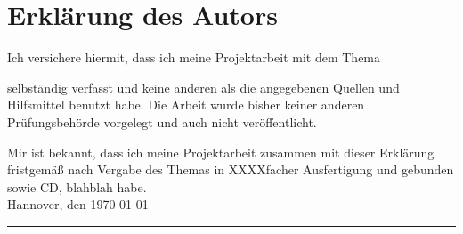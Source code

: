 \section*{Erklärung des Autors}
Ich versichere hiermit, dass ich meine Projektarbeit mit dem Thema
\begin{quote}
\textit{\titel}%
\end{quote}
selbständig verfasst und keine anderen als die angegebenen Quellen und Hilfsmittel benutzt habe. Die Arbeit wurde bisher keiner anderen Prüfungsbehörde vorgelegt und auch nicht veröffentlicht.

Mir ist bekannt, dass ich meine Projektarbeit zusammen mit dieser Erklärung fristgemäß nach Vergabe des Themas in XXXXfacher Ausfertigung und gebunden sowie CD, blahblah habe.\\[6ex]

Hannover, den \today


\rule[-0.2cm]{5cm}{0.5pt}

\textsc{\autor}
\clearpage